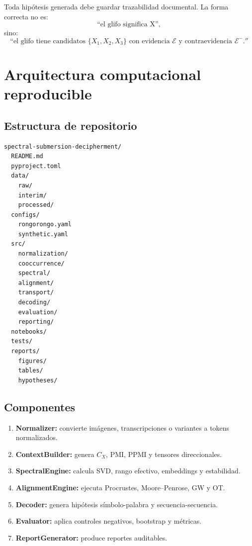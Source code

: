 \documentclass[11pt,a4paper]{article}
\newcommand{\1}{\mathbf{1}}
\numberwithin{equation}{section}
\begin{document}
Toda hipótesis generada debe guardar trazabilidad documental. La forma correcta no es:
\[
    \text{``el glifo significa X''},
\]
sino:
\[
    \text{``el glifo tiene candidatos } \{X_1,X_2,X_3\}
    \text{ con evidencia } \mathcal{E}
    \text{ y contraevidencia } \mathcal{E}^{-}.''
\]

\section{Arquitectura computacional reproducible}

\subsection{Estructura de repositorio}

\begin{verbatim}
spectral-submersion-decipherment/
  README.md
  pyproject.toml
  data/
    raw/
    interim/
    processed/
  configs/
    rongorongo.yaml
    synthetic.yaml
  src/
    normalization/
    cooccurrence/
    spectral/
    alignment/
    transport/
    decoding/
    evaluation/
    reporting/
  notebooks/
  tests/
  reports/
    figures/
    tables/
    hypotheses/
\end{verbatim}

\subsection{Componentes}

\begin{enumerate}[label=\textbf{C\arabic*.}]
    \item \textbf{Normalizer:} convierte imágenes, transcripciones o variantes a tokens normalizados.
    \item \textbf{ContextBuilder:} genera \(C_X\), PMI, PPMI y tensores direccionales.
    \item \textbf{SpectralEngine:} calcula SVD, rango efectivo, embeddings y estabilidad.
    \item \textbf{AlignmentEngine:} ejecuta Procrustes, Moore--Penrose, GW y OT.
    \item \textbf{Decoder:} genera hipótesis símbolo-palabra y secuencia-secuencia.
    \item \textbf{Evaluator:} aplica controles negativos, bootstrap y métricas.
    \item \textbf{ReportGenerator:} produce reportes auditables.
\end{enumerate}
\end{document}
